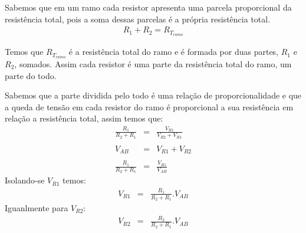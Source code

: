 Sabemos que em um ramo cada resistor apresenta uma parcela proporcional da resistência total, pois a soma dessas parcelas é a própria resistência total.
\begin{eqnarray}
R_1 + R_2 = R_{T_{ramo}}
\end{eqnarray}

Temos que $R_{T_{ramo}}$ é a resistência total do ramo e é formada por duas partes, $R_1$ e $R_2$, somados. Assim cada resistor é uma parte da resistência total do ramo, um parte do todo.

Sabemos que a parte dividida pelo todo é uma relação de proporcionalidade e que a queda de tensão em cada resistor do ramo é proporcional a sua resistência em relação a resistência total, assim temos que:
\begin{eqnarray}
\frac{R_1}{R_2+R_1} & = & \frac{V_{R1}}{V_{R2}+V_{R1}}\\
\nonumber\\
V_{AB} & = & V_{R1} + V_{R2} \\
\nonumber\\
\frac{R_1}{R_2+R_1} & = & \frac{V_{R1}}{V_{AB}}
\end{eqnarray}
Isolando-se $V_{R1}$  temos:
\begin{eqnarray}
V_{R1} & = & \frac{R_1}{R_2 + R_1} . V_{AB}
\end{eqnarray}
Iguanlmente para $V_{R2}$:
\begin{eqnarray}
V_{R2} & = & \frac{R_2}{R_2 + R_1} . V_{AB}
\end{eqnarray}
